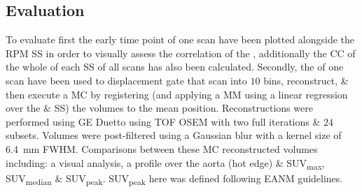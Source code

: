     
    \subsection{Evaluation} \label{sec:evaluation}
        To evaluate first the early time point  of one scan have been plotted alongside the \gls{RPM} \gls{SS} in order to visually assess the correlation of the , additionally the \gls{CC} of the whole of each \gls{SS} of all scans has also been calculated. Secondly, the  of one scan have been used to displacement gate that scan into $10$ bins, reconstruct, \& then execute a \gls{MC} by registering (and applying a \gls{MM} using a linear regression over the  \& \gls{SS}) the volumes to the mean position. Reconstructions were performed using \gls{GE} Duetto using \gls{TOF} \gls{OSEM} with two full iterations \& $24$ subsets.%
        Volumes were post-filtered using a Gaussian blur with a kernel size of \SI{6.4}{\milli\metre} \gls{FWHM}. Comparisons between these \gls{MC} reconstructed volumes including: a visual analysis, a profile over the aorta (hot edge) \& \gls{SUV}\textsubscript{max}, \gls{SUV}\textsubscript{median} \& \gls{SUV}\textsubscript{peak}. \gls{SUV}\textsubscript{peak} here was defined following \gls{EANM} guidelines.%
        
